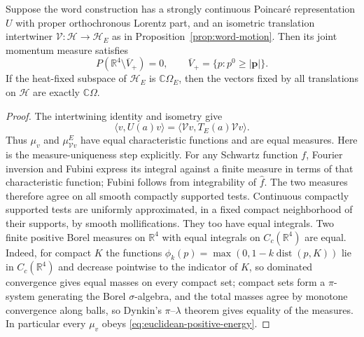 \begin{theorem}\label{thm:field-spectrum}
Suppose the word construction has a strongly continuous Poincar\'e
representation $U$ with proper orthochronous Lorentz part, and an isometric
translation intertwiner $\mathcal V:\mathcal H\to\mathcal H_E$ as in
Proposition~\ref{prop:word-motion}. Then its joint momentum measure satisfies
\[
 P(\mathbb R^4\setminus\overline V_+)=0,
 \qquad \overline V_+=\{p:p^0\geq|\mathbf p|\}.
\]
If the heat-fixed subspace of $\mathcal H_E$ is
$\mathbb C\Omega_E$, then the vectors fixed by all translations on
$\mathcal H$ are exactly $\mathbb C\Omega$.
\end{theorem}
\begin{proof}
The intertwining identity and isometry give
\[
 \langle v,U(a)v\rangle
 =\langle\mathcal Vv,T_E(a)\mathcal Vv\rangle.
\]
Thus $\mu_v$ and $\mu^E_{\mathcal Vv}$ have equal characteristic functions and
are equal measures. Here is the measure-uniqueness step explicitly.
For any Schwartz function $f$, Fourier inversion and Fubini express its
integral against a finite measure in terms of that characteristic
function; Fubini follows from integrability of $\widehat f$.
The two measures therefore agree on all smooth compactly supported tests.
Continuous compactly supported tests are uniformly approximated, in a
fixed compact neighborhood of their supports, by smooth mollifications.
They too have equal integrals. Two finite positive Borel measures on
$\mathbb R^4$ with equal integrals on $C_c(\mathbb R^4)$ are equal. Indeed,
for compact $K$ the functions $\phi_k(p)=\max(0,1-k\operatorname{dist}(p,K))$
lie in $C_c(\mathbb R^4)$ and decrease pointwise to the indicator of $K$, so
dominated convergence gives equal masses on every compact set; compact sets
form a $\pi$-system generating the Borel $\sigma$-algebra, and the total
masses agree by monotone convergence along balls, so Dynkin's
$\pi$--$\lambda$ theorem gives equality of the measures. In particular every
$\mu_v$ obeys \eqref{eq:euclidean-positive-energy}.


\end{proof}
